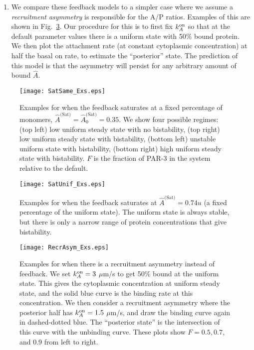 \documentclass[11pt]{article}
\newcommand{\6}[1]{#1_{\text{6}}}
\newcommand{\3}[1]{#1_{\text{3}}}
\newcommand{\Sat}[1]{#1^\text{(Sat)}}
\begin{document}
\begin{enumerate}
\item We compare these feedback models to a simpler case where we assume a \emph{recruitment asymmetry} is responsible for the A/P ratios. Examples of this are shown in Fig.\ \ref{fig:RecAEx}. Our procedure for this is to first fix $k^\text{on}_A$ so that at the default parameter values there is a uniform state with 50\% bound protein. We then plot the attachment rate (at constant cytoplasmic concentration) at half the basal on rate, to estimate the ``posterior'' state. The prediction of this model is that the asymmetry will persist for any arbitrary amount of bound $\hat A$.
\end{enumerate}

\begin{figure}
\centering
\texttt{[image: SatSame\_Exs.eps]}
\caption{\label{fig:SatSameEx}Examples for when the feedback saturates at a fixed percentage of monomers, $\Sat{\hat A}=\Sat{\hat A}_0=0.35$. We show four possible regimes: (top left) low uniform steady state with no bistability, (top right) low uniform steady state with bistability, (bottom left) unstable uniform state with bistability, (bottom right) high uniform steady state with bistability. $F$ is the fraction of PAR-3 in the system relative to the default.}
\end{figure}

\begin{figure}
\centering
\texttt{[image: SatUnif\_Exs.eps]}
\caption{\label{fig:SatUnifEx}Examples for when the feedback saturates at $\Sat{\hat A}=0.74u$ (a fixed percentage of the uniform state). The uniform state is always stable, but there is only a narrow range of protein concentrations that give bistability.  }
\end{figure}


\begin{figure}
\centering
\texttt{[image: RecrAsym\_Exs.eps]}
\caption{\label{fig:RecAEx}Examples for when there is a recruitment asymmetry instead of feedback. We set $k^\text{on}_A=3$ $\mu$m/s to get 50\% bound at the uniform state. This gives the cytoplasmic concentration at uniform steady state, and the solid blue curve is the binding rate at this concentration. We then consider a recruitment asymmetry where the posterior half has $k^\text{on}_A=1.5$ $\mu$m/s, and draw the binding curve again in dashed-dotted blue. The ``posterior state'' is the intersection of this curve with the unbinding curve. These plots show $F=0.5,0.7$, and 0.9 from left to right.}
\end{figure}
\end{document}

